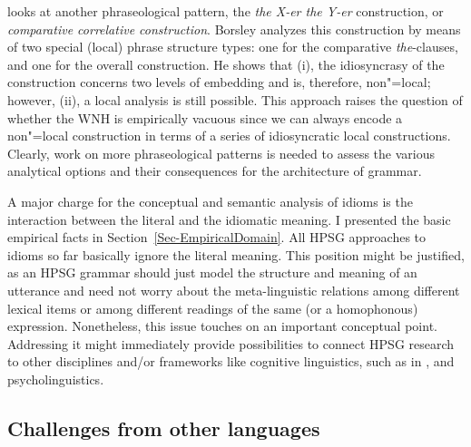 \documentclass[output=paper
                ,modfonts
                ,nonflat
	        ,collection
	        ,collectionchapter
	        ,collectiontoclongg
 	        ,biblatex
                ,babelshorthands
                ,newtxmath
                ,draftmode
                ,colorlinks, citecolor=brown
]{./langsci/langscibook}
\begin{document}
\citet{Borsley2004a} looks at another phraseological pattern, the \emph{the X-er the Y-er} construction, or \emph{comparative correlative construction}.
Borsley analyzes this construction by means of two special (local) phrase structure types: one for the comparative \emph{the}-clauses, and one for the overall construction. He shows that (i), the idiosyncrasy of the construction concerns two levels of embedding and is, therefore, non"=local; however, (ii),
a local analysis is still possible. This approach raises the question of whether the WNH is empirically vacuous since we can always encode a non"=local construction in terms of a series of idiosyncratic local constructions. 
Clearly, work on more phraseological patterns is needed to assess the various analytical options and their consequences for the architecture of grammar.


A major charge for the conceptual and semantic analysis of idioms is the interaction between the literal and the idiomatic meaning. 
I presented the basic empirical facts in Section~\ref{Sec-EmpiricalDomain}. 
All HPSG approaches to idioms so far basically ignore the literal meaning.
This position might be justified, as  an HPSG grammar should just model the structure and meaning of an utterance and need not worry about the meta-linguistic relations among different lexical items or among different readings of the same (or a homophonous) expression.
Nonetheless, this issue touches on an important conceptual point. 
Addressing it might immediately provide possibilities to connect HPSG research to other disciplines and/or frameworks like cognitive linguistics, such as in \citet{Dobrovolskij:Piirainen:05}, and psycholinguistics.




\subsection{Challenges from other languages}
\label{Sec-OtherLanguages}
\end{document}
